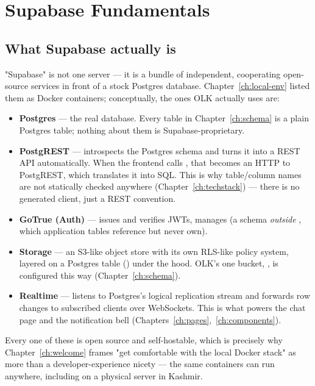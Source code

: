 \chapter{Supabase Fundamentals}
\label{ch:supabase-fundamentals}

\section{What Supabase actually is}

"Supabase" is not one server — it is a bundle of independent, cooperating open-source services in front of a stock Postgres database. Chapter~\ref{ch:local-env} listed them as Docker containers; conceptually, the ones OLK actually uses are:

\begin{itemize}
  \item \textbf{Postgres} — the real database. Every table in Chapter~\ref{ch:schema} is a plain Postgres table; nothing about them is Supabase-proprietary.
  \item \textbf{PostgREST} — introspects the Postgres schema and turns it into a REST API automatically. When the frontend calls , that becomes an HTTP  to PostgREST, which translates it into SQL. This is why table/column names are not statically checked anywhere (Chapter~\ref{ch:techstack}) — there is no generated client, just a REST convention.
  \item \textbf{GoTrue (Auth)} — issues and verifies JWTs, manages  (a schema \emph{outside} , which application tables reference but never own).
  \item \textbf{Storage} — an S3-like object store with its own RLS-like policy system, layered on a Postgres table () under the hood. OLK's one bucket, , is configured this way (Chapter~\ref{ch:schema}).
  \item \textbf{Realtime} — listens to Postgres's logical replication stream and forwards row changes to subscribed clients over WebSockets. This is what powers the chat page and the notification bell (Chapters~\ref{ch:pages},~\ref{ch:components}).
\end{itemize}

\begin{olknote}
Every one of these is open source and self-hostable, which is precisely why Chapter~\ref{ch:welcome} frames "get comfortable with the local Docker stack" as more than a developer-experience nicety — the same containers can run anywhere, including on a physical server in Kashmir.
\end{olknote}


